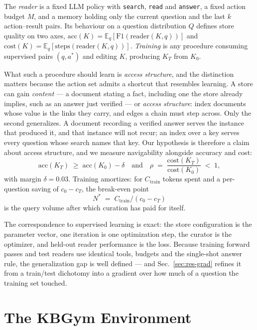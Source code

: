 \documentclass[conference]{IEEEtran}
\newcommand{\kbgym}{KBGym}
\begin{document}
The \emph{reader} is a fixed LLM policy with \texttt{search}, \texttt{read}
and \texttt{answer}, a fixed action budget $M$, and a memory holding only the
current question and the last $k$ action--result pairs. Its behaviour on a
question distribution $Q$ defines store quality on two axes,
$\mathrm{acc}(K) = \mathbb{E}_{q}[\mathrm{F1}(\mathrm{reader}(K,q))]$ and
$\mathrm{cost}(K) = \mathbb{E}_{q}[\mathrm{steps}(\mathrm{reader}(K,q))]$.
\emph{Training} is any procedure consuming supervised pairs $(q,a^{*})$ and
editing $K$, producing $K_T$ from $K_0$.

What such a procedure should learn is \emph{access structure}, and the
distinction matters because the action set admits a shortcut that resembles
learning. A store can gain \emph{content} --- a document stating a fact,
including one the store already implies, such as an answer just verified ---
or \emph{access structure}: index documents whose value is the links they
carry, and edges a chain must step across. Only the second generalizes. A
document recording a verified answer serves the instance that produced it,
and that instance will not recur; an index over a key serves every question
whose search names that key. Our hypothesis is therefore a claim about
access structure, and we measure navigability alongside accuracy and cost:
\begin{equation}
\mathrm{acc}(K_T) \;\ge\; \mathrm{acc}(K_0) - \delta
\quad\text{and}\quad
\rho \;=\; \frac{\mathrm{cost}(K_T)}{\mathrm{cost}(K_0)} \;<\; 1,
\label{eq:hypothesis}
\end{equation}
with margin $\delta = 0.03$. Training amortizes: for $C_{\mathrm{train}}$
tokens spent and a per-question saving of $c_0 - c_T$, the break-even point
\begin{equation}
N^{*} \;=\; C_{\mathrm{train}} / (c_0 - c_T)
\label{eq:breakeven}
\end{equation}
is the query volume after which curation has paid for itself.

The correspondence to supervised learning is exact: the store configuration
is the parameter vector, one iteration is one optimization step, the
curator is the optimizer, and held-out reader performance is the
loss. Because training forward passes and test readers use identical tools,
budgets and the single-shot answer rule, the generalization gap is well
defined --- and Sec.~\ref{sec:res-grad} refines it from a train/test
dichotomy into a gradient over how much of a question the training set
touched.

\section{The \kbgym{} Environment}\label{sec:env}
\end{document}
